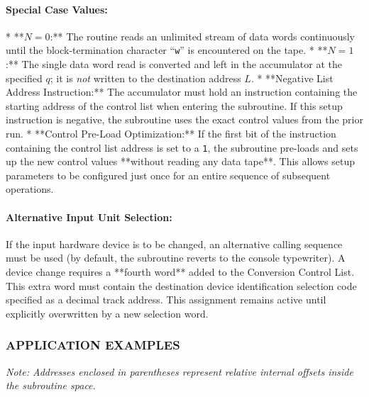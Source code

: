 \paragraph{Special Case Values:}
* **$N = 0$:** The routine reads an unlimited stream of data words continuously until the block-termination character ``\texttt{w}'' is encountered on the tape.
* **$N = 1$:** The single data word read is converted and left in the accumulator at the specified $q$; it is \emph{not} written to the destination address $L$.
* **Negative List Address Instruction:** The accumulator must hold an instruction containing the starting address of the control list when entering the subroutine. If this setup instruction is negative, the subroutine uses the exact control values from the prior run. 
* **Control Pre-Load Optimization:** If the first bit of the instruction containing the control list address is set to a \texttt{1}, the subroutine pre-loads and sets up the new control values **without reading any data tape**. This allows setup parameters to be configured just once for an entire sequence of subsequent operations.

\paragraph{Alternative Input Unit Selection:}
If the input hardware device is to be changed, an alternative calling sequence must be used (by default, the subroutine reverts to the console typewriter). A device change requires a **fourth word** added to the Conversion Control List. This extra word must contain the destination device identification selection code specified as a decimal track address. This assignment remains active until explicitly overwritten by a new selection word.

\subsubsection*{APPLICATION EXAMPLES}
\textit{Note: Addresses enclosed in parentheses represent relative internal offsets inside the subroutine space.}

